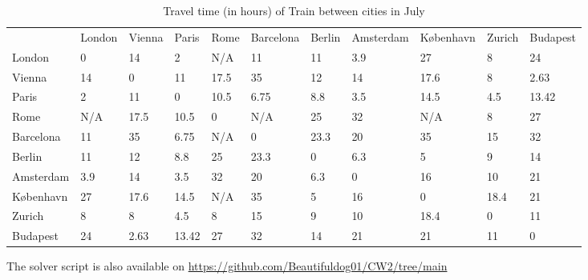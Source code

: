 \documentclass{article} %
\begin{document}
\begin{table}[!ht]
  \centering
  \begin{tabular}{lllllllllll}

     & London & Vienna & Paris & Rome & Barcelona & Berlin & Amsterdam & København & Zurich & Budapest \\

  London & 0 & 14 & 2 & N/A & 11 & 11 & 3.9 & 27 & 8 & 24 \\

  Vienna & 14 & 0 & 11 & 17.5 & 35 & 12 & 14 & 17.6 & 8 & 2.63 \\

  Paris & 2 & 11 & 0 & 10.5 & 6.75 & 8.8 & 3.5 & 14.5 & 4.5 & 13.42 \\

  Rome & N/A & 17.5 & 10.5 & 0 & N/A & 25 & 32 & N/A & 8 & 27 \\

  Barcelona & 11 & 35 & 6.75 & N/A & 0 & 23.3 & 20 & 35 & 15 & 32 \\

  Berlin & 11 & 12 & 8.8 & 25 & 23.3 & 0 & 6.3 & 5 & 9 & 14 \\

  Amsterdam & 3.9 & 14 & 3.5 & 32 & 20 & 6.3 & 0 & 16 & 10 & 21 \\

  København & 27 & 17.6 & 14.5 & N/A & 35 & 5 & 16 & 0 & 18.4 & 21 \\

  Zurich & 8 & 8 & 4.5 & 8 & 15 & 9 & 10 & 18.4 & 0 & 11 \\

  Budapest & 24 & 2.63 & 13.42 & 27 & 32 & 14 & 21 & 21 & 11 & 0 \\
  \end{tabular}
  \caption{Travel time (in hours) of Train between cities in July}%
  \label{tab:timetrain}
\end{table}
\clearpage
The solver script is also available on \url{https://github.com/Beautifuldog01/CW2/tree/main}
\end{document}
